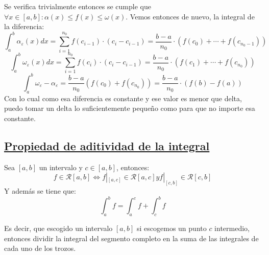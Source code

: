 \documentclass[10pt,a4paper,openright]{book}
\begin{document}
Se verifica trivialmente entonces se cumple que $\forall x\in [a,b]: \alpha(x)\leq f(x)\leq \omega(x)$. Vemos entonces de nuevo, la integral de la diferencia:
$$\int_{a}^{b}\alpha_\varepsilon(x) dx = \sum_{i = 1}^{n_0} f(c_{i-1})\cdot (c_i-c_{i-1}) = \frac{b-a}{n_0} \cdot (f(c_0)+\cdots + f(c_{n_0-1}))$$
$$\int_{a}^{b}\omega_\varepsilon(x) dx = \sum_{i = 1}^{n_0} f(c_i)\cdot (c_i-c_{i-1}) = \frac{b-a}{n_0} \cdot (f(c_1)+\cdots + f(c_{n_0}))$$
$$\int_{a}^{b} \omega_\varepsilon - \alpha_\varepsilon = \frac{b-a}{n_0}(f(c_0)+f(c_{n_0})) = \frac{b-a}{n_0}\cdot (f(b)-f(a))$$
Con lo cual como esa diferencia es constante y ese valor es menor que delta, puedo tomar un delta lo suficientemente pequeño como para que no importe esa constante.

\subsection*{\underline{Propiedad de aditividad de la integral}}
Sea $[a,b]$ un intervalo y $c\in [a,b]$, entonces:
$$f \in \mathcal{R}[a,b]\Leftrightarrow f|_{[a,c]} \in \mathcal{R} [a,c] y f|_{[c,b]} \in \mathcal{R} [c,b]$$
Y además se tiene que:
$$\int_{a}^{b} f = \int_{a}^{c} f + \int_{c}^{b} f$$

Es decir, que escogido un intervalo $[a,b]$ si escogemos un punto $c$ intermedio, entonces dividir la integral del segmento completo en la suma de las integrales de cada uno de los trozos.
\end{document}
